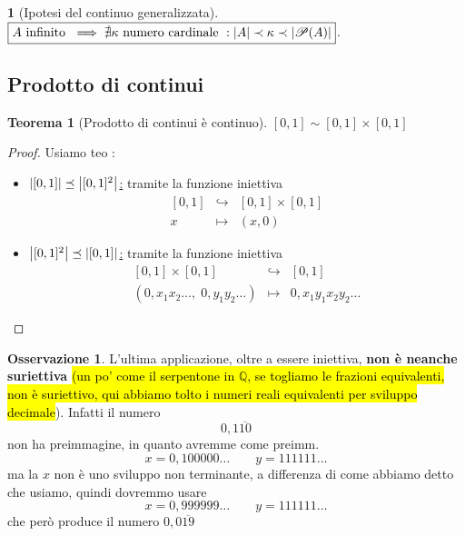 \documentclass[a4paper,10pt]{article}
\theoremstyle{definition}
\newcommand{\qu}{\mathbb{Q}} %
\theoremstyle{indentdefinition}
\theoremstyle{indentpostulate}
\theoremstyle{indenttheorem}
\newtheorem{thm}{Teorema}[section]
\theoremstyle{myremark}
\newtheorem*{rem*}{Osservazione}
\theoremstyle{indentgeneral}
\newtheorem*{gen}{}
\newenvironment{myboxed} 
{\noindent\begin{lrbox}{\mybox}\begin{minipage}{\textwidth}}
{\end{minipage}\end{lrbox}\fbox{\usebox{\mybox}}}
\begin{document}
\begin{gen}[Ipotesi del continuo generalizzata]  $\boxed{A \text{ infinito }\implies \nexists\kappa  \text{ numero cardinale }: \abs{A}\prec \kappa \prec \abs{\mathscr{P}(A)}}$. 
\end{gen}

\subsection{Prodotto di continui}
\begin{myboxed}
    \begin{thm}[Prodotto di continui è continuo]
        $[0,1]\sim[0,1]\times[0,1]$
    \end{thm}
\end{myboxed}

\begin{proof}
    Usiamo teo :
    \begin{itemize}
        \item \underline{$\abs{[0,1]}\preceq\abs{[0,1]^2}$:} tramite la funzione iniettiva 
        $$\begin{array}{ccc}
       [0,1] & \hookrightarrow &  [0,1]\times[0,1] \\
            x & \mapsto & (x,0)
        \end{array}$$
        \item \underline{$\abs{[0,1]^2}\preceq\abs{[0,1]}$:} tramite la funzione iniettiva 
        $$\begin{array}{ccc}
       [0,1]\times [0,1] & \hookrightarrow &  [0,1] \\
            (0,x_1x_2\dots,\;0,y_1y_2\dots) & \mapsto & 0,x_1y_1x_2y_2\dots
        \end{array}$$
    \end{itemize}
\end{proof}

\begin{rem*}
    L'ultima applicazione, oltre a essere iniettiva, \textbf{non è neanche suriettiva} \hl{(un po' come il serpentone in $\qu$, se togliamo le frazioni equivalenti, non è suriettivo, qui abbiamo tolto i numeri reali equivalenti per sviluppo decimale}). Infatti il numero 
    $$0,1\overline{10}$$
    non ha preimmagine, in quanto avremme come preimm.
    $$x=0,100000\dots\qquad y=111111\dots$$
    ma la $x$ non è uno sviluppo non terminante, a differenza di come abbiamo detto che usiamo, quindi dovremmo usare
     $$x=0,999999\dots\qquad y=111111\dots$$
     che però produce il numero $0,0\overline{19}$
\end{rem*}
\end{document}
